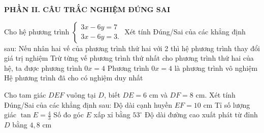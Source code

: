 \documentclass[12pt,a4paper]{article}
\begin{document}
\setcounter{ex}{0}
\noindent\textbf{\large PHẦN II. CÂU TRẮC NGHIỆM ĐÚNG SAI}
\vspace{1mm}
\begin{ex}
Cho hệ phương trình $\begin{cases} 3x - 6y = 7 \\ 3x - 6y = 3. \end{cases}$ Xét tính Đúng/Sai của các khẳng định sau:
\choiceTF
{\True Nếu nhân hai vế của phương trình thứ hai với 2 thì hệ phương trình thay đổi giá trị nghiệm}
{\True Trừ từng vế phương trình thứ nhất cho phương trình thứ hai của hệ, ta được phương trình $0x = 4$}
{\True Phương trình $0x = 4$ là phương trình vô nghiệm}
{Hệ phương trình đã cho có nghiệm duy nhất}
\end{ex}

\begin{ex}
Cho tam giác $DEF$ vuông tại $D$, biết $DE = 6\text{ cm}$ và $DF = 8\text{ cm}$. Xét tính Đúng/Sai của các khẳng định sau:
\choiceTF
{\True Độ dài cạnh huyền $EF = 10\text{ cm}$}
{\True Tỉ số lượng giác $\tan E = \frac{4}{3}$}
{\True Số đo góc $E$ xấp xỉ bằng $53^\circ$}
{\True Độ dài đường cao xuất phát từ đỉnh $D$ bằng $4{,}8\text{ cm}$}
\end{ex}
\end{document}
